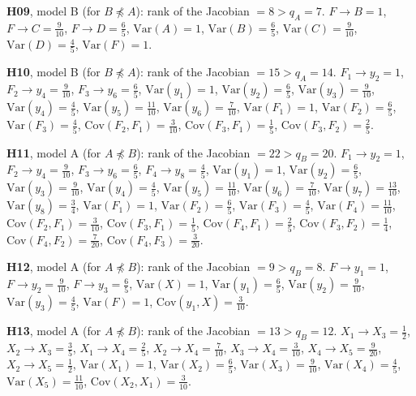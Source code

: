 \documentclass[10pt,a4paper]{article}
\newcommand{\nnest}{\not\preceq}
\begin{document}
{\noindent\textbf{H09}, model B (for $B\nnest A$): rank of the Jacobian $=8>q_A=7$. {\footnotesize $F\to B=1$, $F\to C=\tfrac{9}{10}$, $F\to D=\tfrac{6}{5}$, $\mathrm{Var}(A)=1$, $\mathrm{Var}(B)=\tfrac{6}{5}$, $\mathrm{Var}(C)=\tfrac{9}{10}$, $\mathrm{Var}(D)=\tfrac{4}{5}$, $\mathrm{Var}(F)=1$.}\par\smallskip
\noindent\textbf{H10}, model B (for $B\nnest A$): rank of the Jacobian $=15>q_A=14$. {\footnotesize $F_{1}\to y_{2}=1$, $F_{2}\to y_{4}=\tfrac{9}{10}$, $F_{3}\to y_{6}=\tfrac{6}{5}$, $\mathrm{Var}(y_{1})=1$, $\mathrm{Var}(y_{2})=\tfrac{6}{5}$, $\mathrm{Var}(y_{3})=\tfrac{9}{10}$, $\mathrm{Var}(y_{4})=\tfrac{4}{5}$, $\mathrm{Var}(y_{5})=\tfrac{11}{10}$, $\mathrm{Var}(y_{6})=\tfrac{7}{10}$, $\mathrm{Var}(F_{1})=1$, $\mathrm{Var}(F_{2})=\tfrac{6}{5}$, $\mathrm{Var}(F_{3})=\tfrac{4}{5}$, $\mathrm{Cov}(F_{2},F_{1})=\tfrac{3}{10}$, $\mathrm{Cov}(F_{3},F_{1})=\tfrac{1}{5}$, $\mathrm{Cov}(F_{3},F_{2})=\tfrac{2}{5}$.}\par\smallskip
\noindent\textbf{H11}, model A (for $A\nnest B$): rank of the Jacobian $=22>q_B=20$. {\footnotesize $F_{1}\to y_{2}=1$, $F_{2}\to y_{4}=\tfrac{9}{10}$, $F_{3}\to y_{6}=\tfrac{6}{5}$, $F_{4}\to y_{8}=\tfrac{4}{5}$, $\mathrm{Var}(y_{1})=1$, $\mathrm{Var}(y_{2})=\tfrac{6}{5}$, $\mathrm{Var}(y_{3})=\tfrac{9}{10}$, $\mathrm{Var}(y_{4})=\tfrac{4}{5}$, $\mathrm{Var}(y_{5})=\tfrac{11}{10}$, $\mathrm{Var}(y_{6})=\tfrac{7}{10}$, $\mathrm{Var}(y_{7})=\tfrac{13}{10}$, $\mathrm{Var}(y_{8})=\tfrac{3}{4}$, $\mathrm{Var}(F_{1})=1$, $\mathrm{Var}(F_{2})=\tfrac{6}{5}$, $\mathrm{Var}(F_{3})=\tfrac{4}{5}$, $\mathrm{Var}(F_{4})=\tfrac{11}{10}$, $\mathrm{Cov}(F_{2},F_{1})=\tfrac{3}{10}$, $\mathrm{Cov}(F_{3},F_{1})=\tfrac{1}{5}$, $\mathrm{Cov}(F_{4},F_{1})=\tfrac{2}{5}$, $\mathrm{Cov}(F_{3},F_{2})=\tfrac{1}{4}$, $\mathrm{Cov}(F_{4},F_{2})=\tfrac{7}{20}$, $\mathrm{Cov}(F_{4},F_{3})=\tfrac{3}{20}$.}\par\smallskip
\noindent\textbf{H12}, model A (for $A\nnest B$): rank of the Jacobian $=9>q_B=8$. {\footnotesize $F\to y_{1}=1$, $F\to y_{2}=\tfrac{9}{10}$, $F\to y_{3}=\tfrac{6}{5}$, $\mathrm{Var}(X)=1$, $\mathrm{Var}(y_{1})=\tfrac{6}{5}$, $\mathrm{Var}(y_{2})=\tfrac{9}{10}$, $\mathrm{Var}(y_{3})=\tfrac{4}{5}$, $\mathrm{Var}(F)=1$, $\mathrm{Cov}(y_{1},X)=\tfrac{3}{10}$.}\par\smallskip
\noindent\textbf{H13}, model A (for $A\nnest B$): rank of the Jacobian $=13>q_B=12$. {\footnotesize $X_{1}\to X_{3}=\tfrac{1}{2}$, $X_{2}\to X_{3}=\tfrac{3}{5}$, $X_{1}\to X_{4}=\tfrac{2}{5}$, $X_{2}\to X_{4}=\tfrac{7}{10}$, $X_{3}\to X_{4}=\tfrac{3}{10}$, $X_{4}\to X_{5}=\tfrac{9}{20}$, $X_{2}\to X_{5}=\tfrac{1}{2}$, $\mathrm{Var}(X_{1})=1$, $\mathrm{Var}(X_{2})=\tfrac{6}{5}$, $\mathrm{Var}(X_{3})=\tfrac{9}{10}$, $\mathrm{Var}(X_{4})=\tfrac{4}{5}$, $\mathrm{Var}(X_{5})=\tfrac{11}{10}$, $\mathrm{Cov}(X_{2},X_{1})=\tfrac{3}{10}$.}\par\smallskip
}
\end{document}
